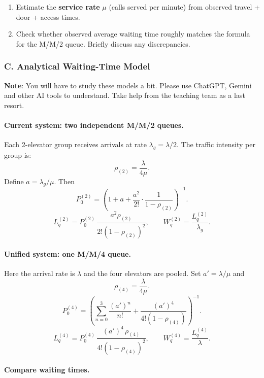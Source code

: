 \documentclass[11pt]{article}
\begin{document}
\begin{enumerate}
    \item Estimate the \textbf{service rate} $\mu$ (calls served per minute) from
    observed travel + door + access times.
    \item Check whether observed average waiting time roughly matches the
    formula for the M/M/2 queue. Briefly discuss any discrepancies.
\end{enumerate}

\subsubsection{C. Analytical Waiting-Time Model}

\noindent
{\bf Note}: You will have to study these models a bit. Please use ChatGPT, Gemini and other AI tools to understand. Take help from the teaching team as a last resort.

\paragraph{Current system: two independent M/M/2 queues.}

Each 2-elevator group receives arrivals at rate $\lambda_g = \lambda/2$.
The traffic intensity per group is:
\[
    \rho_{(2)} = \frac{\lambda}{4\mu}.
\]
Define $a = \lambda_g/\mu$. Then
\[
    P_0^{(2)} =
    \left( 1 + a + \frac{a^2}{2!}\cdot \frac{1}{1-\rho_{(2)}} \right)^{-1}.
\]
\[
    L_q^{(2)} =
    P_0^{(2)}\,\frac{a^2\rho_{(2)}}{2!(1-\rho_{(2)})^2},
   \qquad
   W_q^{(2)} = \frac{L_q^{(2)}}{\lambda_g}.
\]

\paragraph{Unified system: one M/M/4 queue.}

Here the arrival rate is $\lambda$ and the four elevators are pooled.
Set $a' = \lambda/\mu$ and
\[
    \rho_{(4)} = \frac{\lambda}{4\mu}.
\]
\[
    P_0^{(4)} =
    \left(
        \sum_{n=0}^{3}\frac{(a')^n}{n!}
        + \frac{(a')^4}{4!(1-\rho_{(4)})}
    \right)^{-1}.
\]
\[
    L_q^{(4)} =
    P_0^{(4)}\,
    \frac{(a')^4\,\rho_{(4)}}
         {4!(1-\rho_{(4)})^2},
    \qquad
    W_q^{(4)} = \frac{L_q^{(4)}}{\lambda}.
\]

\paragraph{Compare waiting times.}
\end{document}
